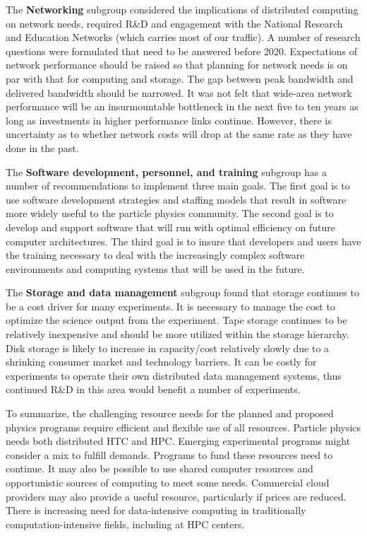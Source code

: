 The {\bf Networking} subgroup considered the implications of distributed
computing on network needs, required R\&D and engagement with the National
Research and Education Networks (which carries most of our traffic). A
number of research questions were formulated that need to be answered
before 2020. Expectations of network performance should be raised so that
planning for network needs is on par with that for computing and storage.
The gap between peak bandwidth and delivered bandwidth should be narrowed.
It was not felt that wide-area network performance will be an
insurmountable bottleneck in the next five to ten years as long as
investments in higher performance links continue. However, there is
uncertainty as to whether network costs will drop at the same rate as they
have done in the past.

The {\bf Software development, personnel, and training} subgroup has a
number of recommendations to implement three main goals. The first goal is
to use software development strategies and staffing models that result in
software more widely useful to the particle physics community. The second goal is to
develop and support software that will run with optimal efficiency on
future computer architectures. The third goal is to insure that developers
and users have the training necessary to deal with the increasingly complex
software environments and computing systems that will be used in the future.

The {\bf Storage and data management} subgroup found that storage continues
to be a cost driver for many experiments. It is necessary to manage the
cost to optimize the science output from the experiment. Tape storage
continues to be relatively inexpensive and should be more utilized within
the storage hierarchy. 
Disk storage is likely to increase in capacity/cost relatively slowly due
to a shrinking consumer market and technology barriers.
It  can be costly for experiments to operate their own
distributed data management systems, thus
continued R\&D in this area would benefit a number of experiments.

To summarize, the challenging resource needs for the planned and proposed
physics programs require efficient and flexible use of all resources. 
Particle physics
needs both distributed HTC and HPC.  Emerging experimental programs might
consider a mix to fulfill demands. 
Programs to fund these resources need to continue. 
It may also be possible to use shared computer resources and opportunistic 
sources of computing to meet some needs.  Commercial cloud providers
may also provide a useful resource, particularly if prices are reduced.
There is increasing need for data-intensive computing in traditionally
computation-intensive fields, including at HPC centers.  

